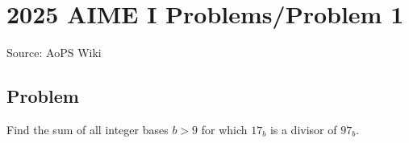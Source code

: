 \documentclass[12pt]{article}
\begin{document}
\section*{{2025 AIME I Problems/Problem 1}}
Source: AoPS Wiki

\subsection*{Problem}
Find the sum of all integer bases $b>9$ for which $17_b$ is a divisor of $97_b.$
\end{document}
